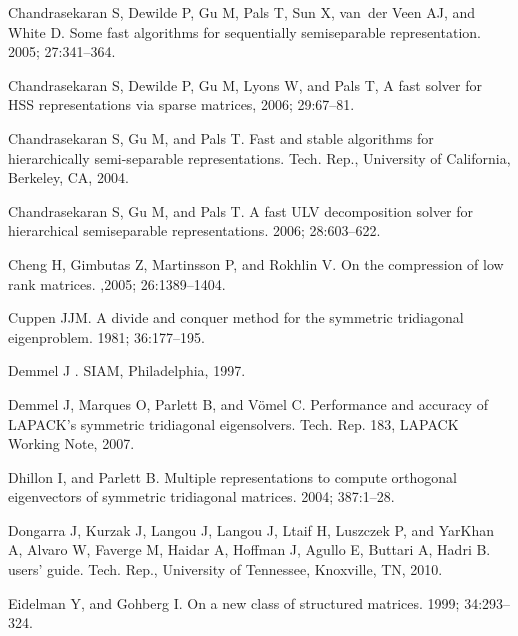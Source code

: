 \documentclass[times]{nlaauth}
\newcounter{algorithm}
\begin{document}
\begin{thebibliography}{99}
{  Chandrasekaran S, Dewilde P, Gu M, Pals T, Sun X, van~der Veen
  AJ, and White D.}
\newblock Some fast algorithms for sequentially semiseparable representation.
 2005; 27:341--364.

{Chandrasekaran S, Dewilde P, Gu M, Lyons W, and Pals T},
\newblock A fast solver for {HSS} representations via sparse matrices,
 2006; 29:67--81.

{  Chandrasekaran S, Gu M, and Pals T.}
\newblock Fast and stable algorithms for hierarchically semi-separable
  representations.
\newblock Tech. Rep., University of California, Berkeley, CA, 2004.

{  Chandrasekaran S, Gu M, and Pals T.}
\newblock A fast {ULV} decomposition solver for hierarchical semiseparable
  representations.
 2006; 28:603--622.

{  Cheng H, Gimbutas Z, Martinsson P, and Rokhlin V.}
\newblock On the compression of low rank matrices.
,2005; 26:1389--1404.

{  Cuppen JJM.}
\newblock A divide and conquer method for the symmetric tridiagonal
  eigenproblem.
 1981; 36:177--195.

{  Demmel J}
.
\newblock SIAM, Philadelphia, 1997.

{  Demmel J, Marques O, Parlett B, and V\"{o}mel C.}
\newblock Performance and accuracy of {LAPACK}'s symmetric tridiagonal
  eigensolvers.
\newblock Tech. Rep. 183, LAPACK Working Note, 2007.

{  Dhillon I, and Parlett B.}
\newblock Multiple representations to compute orthogonal eigenvectors of
  symmetric tridiagonal matrices.
 2004; 387:1--28.

{  Dongarra J, Kurzak J, Langou J, Langou J, Ltaif H, Luszczek P, and YarKhan A,
    Alvaro W, Faverge M, Haidar A, Hoffman J, Agullo E, Buttari A, Hadri B. }
 users' guide.
\newblock Tech. Rep., University of Tennessee, Knoxville, TN, 2010.

{  Eidelman Y, and Gohberg I.}
\newblock On a new class of structured matrices.
 1999; 34:293--324.


\end{thebibliography}
\end{document}
